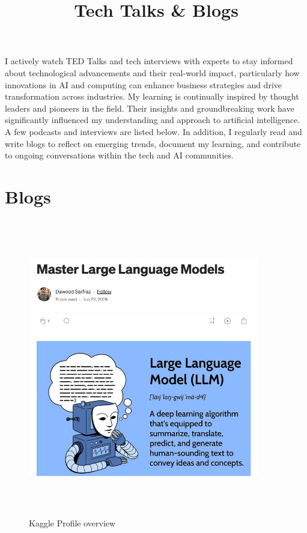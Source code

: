 \documentclass[a4paper,12pt]{article}
\date{}
\title {\textbf{Tech Talks \& Blogs}}
\begin{document}
	\maketitle
	\vspace{-60pt} %
I actively watch TED Talks and tech interviews with experts to stay informed about technological advancements and their real-world impact, particularly how innovations in AI and computing can enhance business strategies and drive transformation across industries. My learning is continually inspired by thought leaders and pioneers in the field. Their insights and groundbreaking work have significantly influenced my understanding and approach to artificial intelligence. A few podcasts and interviews are listed below.
\newline
\newline
In addition, I regularly read and write blogs to reflect on emerging trends, document my learning, and contribute to ongoing conversations within the tech and AI communities.
\\
\section*{Blogs}
\vspace{-2pt} %
\begin{figure}[h]
	\centering
	\vspace{-10pt} %
	\includegraphics[width=0.9\textwidth, height=13cm, keepaspectratio]{../Talks Blogs/Master Large Language Models}
	\vspace{-5pt} %
	\caption{Kaggle Profile overview}
	\vspace{-10pt}
\end{figure}
\end{document}
